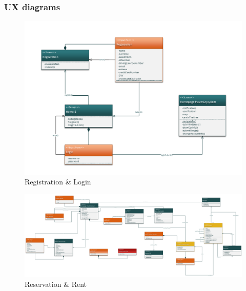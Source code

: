 \documentclass[english]{article}
\begin{document}
			\subsubsection{UX diagrams}
				\begin{figure}[H]
					\centering
					\includegraphics[scale=0.55]{./UXDiagrams/User/Login/UXDiagramRegistrationAndLoginUser.pdf}%
					\caption{Registration \& Login}
				\end{figure}
				\begin{landscape}
					\begin{figure}[H]
						\centering
						\includegraphics[scale=0.26]{./UXDiagrams/User/ReservationAndRent/UXDiagramPowerEnjoyUserSchermoCellulareAuto.pdf}%
						\caption{Reservation \& Rent}
					\end{figure}
				\end{landscape}
\end{document}
